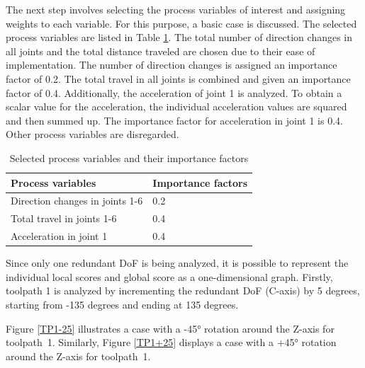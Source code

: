 The next step involves selecting the process variables of interest and assigning weights to each variable. For this purpose, a basic case is discussed. The selected process variables are listed in Table \ref{PPbasic}. The total number of direction changes in all joints and the total distance traveled are chosen due to their ease of implementation. The number of direction changes is assigned an importance factor of 0.2.
The total travel in all joints is combined and given an importance factor of 0.4.
Additionally, the acceleration of joint 1 is analyzed. To obtain a scalar value for the acceleration, the individual acceleration values are squared and then summed up. The importance factor for acceleration in joint 1 is 0.4. Other process variables are disregarded.

\begin{table}[H]
	\centering
	\begin{tabular}{||l|l||}
		Process variables& Importance factors \\
		\hline
		\hline
		\hline
		Direction changes in joints 1-6	&		0.2 \\
		Total travel in joints 1-6	&  	0.4 \\
		Acceleration in joint 1	& 		0.4\\
		
		\hline
		\hline
	\end{tabular}
	
	\caption{Selected process variables and their importance factors}
	\label{PPbasic}
\end{table}


Since only one redundant \acrshort{DoF} is being analyzed, it is possible to represent the individual local scores and global score as a one-dimensional graph. Firstly, toolpath 1 is analyzed by incrementing the redundant \acrshort{DoF} (C-axis) by 5 degrees, starting from -135 degrees and ending at 135 degrees.


\newpage


Figure \ref{TP1-25} illustrates a case with a -45° rotation around the Z-axis for toolpath~1.
Similarly, Figure \ref{TP1+25} displays a case with a +45° rotation around the Z-axis for toolpath~1.

